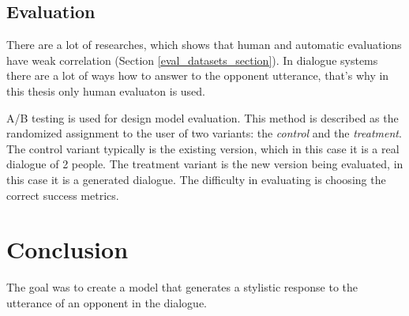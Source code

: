 \section{Evaluation}
There are a lot of researches, which shows that human and automatic evaluations have weak correlation (Section \ref{eval_datasets_section}). In dialogue systems there are a lot of ways how to answer to the opponent utterance, that's why in this thesis only human evaluaton is used. 

A/B testing \cite{kohavi2017online} is used for design model evaluation. This method is described as the randomized assignment to the user of two variants: the \textit{control} and the \textit{treatment}. The control variant typically is the existing version, which in this case it is a real dialogue of 2 people. The treatment variant is the new version being evaluated, in this case it is a generated dialogue. The difficulty in evaluating is choosing the correct success metrics.  

\chapter{Conclusion} \label{conclusion}
The goal was to create a model that generates a stylistic response to the utterance of an opponent in the dialogue. 


